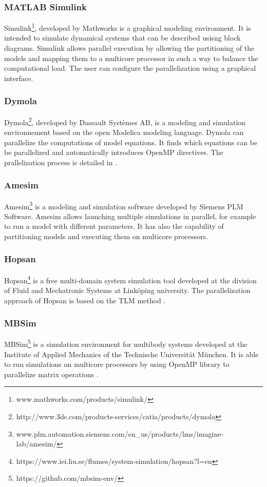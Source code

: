 
\subsubsection{MATLAB Simulink}
Simulink\footnote{www.mathworks.com/products/simulink/}, developed by Mathworks is a graphical modeling environment. It is intended to simulate dynamical systems that can be described usisng block diagrams. Simulink allows parallel execution by allowing the partitioning of the models and mapping them to a multicore processor in such a way to balance the computational load. The user can configure the parallelization using a graphical interface.

\subsubsection{Dymola}
Dymola\footnote{http://www.3ds.com/products-services/catia/products/dymola}, developed by Dassault Syst\`emes AB, is a modeling and simulation environnement based on the open Modelica modeling language. Dymola can parallelize the computations of model equations. It finds which equations can be be parallelized and automatically introduces OpenMP directives. The prallelization process is detailed in \cite{Elmqvist2014}.

\subsubsection{Amesim}
Amesim\footnote{www.plm.automation.siemens.com/en\_us/products/lms/imagine-lab/amesim/} is a modeling and simulation software developed by Siemens PLM Software. Amesim allows launching multiple simulations in parallel, for example to run a model with different parameters. It has also the capability of partitioning models and executing them on multicore processors.

\subsubsection{Hopsan}
Hopsan\footnote{https://www.iei.liu.se/flumes/system-simulation/hopsan?l=en} is a free multi-domain system simulation tool developed at the division of Fluid and Mechatronic Systems at Link\"oping university. The parallelization approach of Hopsan is based on the TLM method \cite{sjolund:2010,braun:2012}.

\subsubsection{MBSim}
MBSim\footnote{https://github.com/mbsim-env/} is a simulation environment for multibody systems developed at the Institute of Applied Mechanics of the Technische Universit\"at M\"unchen. It is able to run simulations on multicore processors by using OpenMP library to parallelize matrix operations \cite{clauberg:2012}.    